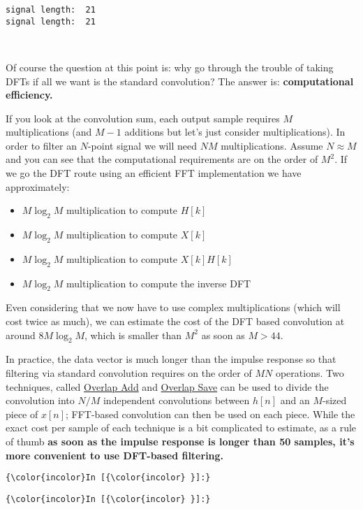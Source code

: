 \documentclass[11pt]{article}
\providecommand{\tightlist}{%
      \setlength{\itemsep}{0pt}\setlength{\parskip}{0pt}}
\begin{document}
    \begin{Verbatim}[commandchars=\\\{\}]
signal length:  21
signal length:  21

    \end{Verbatim}

    \begin{center}
    \end{center}
    { \hspace*{\fill} \\}
    
    Of course the question at this point is: why go through the trouble of
taking DFTs if all we want is the standard convolution? The answer is:
\textbf{computational efficiency.}

If you look at the convolution sum, each output sample requires \(M\)
multiplications (and \(M-1\) additions but let's just consider
multiplications). In order to filter an \(N\)-point signal we will need
\(NM\) multiplications. Assume \(N \approx M\) and you can see that the
computational requirements are on the order of \(M^2\). If we go the DFT
route using an efficient FFT implementation we have approximately:

\begin{itemize}
\tightlist
\item
  \(M\log_2 M\) multiplication to compute \(H[k]\)
\item
  \(M\log_2 M\) multiplication to compute \(X[k]\)
\item
  \(M\log_2 M\) multiplication to compute \(X[k]H[k]\)
\item
  \(M\log_2 M\) multiplication to compute the inverse DFT
\end{itemize}

Even considering that we now have to use complex multiplications (which
will cost twice as much), we can estimate the cost of the DFT based
convolution at around \(8M\log_2M\), which is smaller than \(M^2\) as
soon as \(M>44\).

    In practice, the data vector is much longer than the impulse response so
that filtering via standard convolution requires on the order of \(MN\)
operations. Two techniques, called
\href{https://en.wikipedia.org/wiki/Overlap\%E2\%80\%93add_method}{Overlap
Add} and
\href{https://en.wikipedia.org/wiki/Overlap\%E2\%80\%93save_method}{Overlap
Save} can be used to divide the convolution into \(N/M\) independent
convolutions between \(h[n]\) and an \(M\)-sized piece of \(x[n]\);
FFT-based convolution can then be used on each piece. While the exact
cost per sample of each technique is a bit complicated to estimate, as a
rule of thumb \textbf{as soon as the impulse response is longer than 50
samples, it's more convenient to use DFT-based filtering.}

    \begin{Verbatim}[commandchars=\\\{\}]
{\color{incolor}In [{\color{incolor} }]:} 
\end{Verbatim}


    \begin{Verbatim}[commandchars=\\\{\}]
{\color{incolor}In [{\color{incolor} }]:} 
\end{Verbatim}



    
    
    
    
\end{document}
